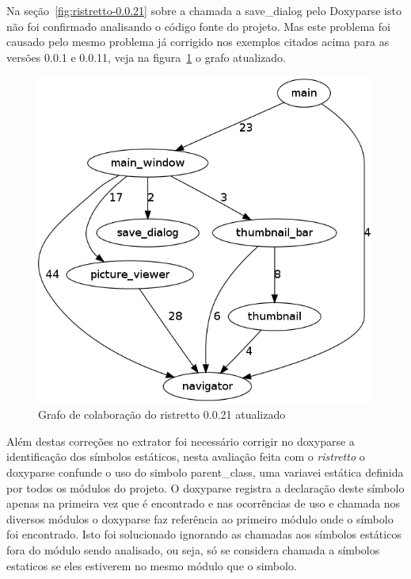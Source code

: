 Na seção~\ref{fig:ristretto-0.0.21} sobre a chamada a save\_dialog pelo Doxyparse isto não foi confirmado analisando o código fonte do projeto.
Mas este problema foi causado pelo mesmo problema já corrigido nos exemplos
citados acima para as versões 0.0.1 e 0.0.11, veja na
figura~\ref{fig:ristretto-0.0.21-doxyparse-2} o grafo atualizado.

\begin{figure}
\center
\includegraphics[scale=0.3]{imagens/ristretto-0_0_21-doxyparse-2}
\caption{Grafo de colaboração do ristretto 0.0.21 atualizado}
\label{fig:ristretto-0.0.21-doxyparse-2}
\end{figure}

Além destas correções no extrator foi necessário corrigir no doxyparse a
identificação dos símbolos estáticos, nesta avaliação feita com o {\it ristretto} o
doxyparse confunde o uso do simbolo parent\_class, uma variavei estática
definida por todos os módulos do projeto. O doxyparse registra a declaração
deste símbolo apenas na primeira vez que é encontrado e nas ocorrências de uso
e chamada nos diversos módulos o doxyparse faz referência ao primeiro módulo
onde o símbolo foi encontrado. Isto foi solucionado ignorando as chamadas aos
símbolos estáticos fora do módulo sendo analisado, ou seja, só se considera
chamada a símbolos estaticos se eles estiverem no mesmo módulo que o simbolo.

